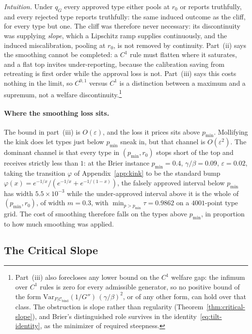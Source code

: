 \documentclass[acmsmall,nonacm,screen]{acmart}
\theoremstyle{acmplain}%
\theoremstyle{acmdefinition}%
\newcommand{\Cbind}{\mathcal{C}_{\mathrm{bind}}}
\numberwithin{equation}{section}
\begin{document}
\emph{Intuition.} Under $q_G$ every approved type either pools at $r_0$ or reports truthfully, and every rejected type reports truthfully: the same induced outcome as the cliff, for every type but one. The cliff was therefore never necessary: its discontinuity was supplying \emph{slope}, which a Lipschitz ramp supplies continuously, and the induced miscalibration, pooling at $r_0$, is not removed by continuity. Part~(ii) says the smoothing cannot be completed: a $C^1$ rule must flatten where it saturates, and a flat top invites under-reporting, because the calibration saving from retreating is first order while the approval loss is not. Part~(iii) says this costs nothing in the limit, so $C^{0,1}$ versus $C^1$ is a distinction between a maximum and a supremum, not a welfare discontinuity.\footnote{Part~(iii) also forecloses any lower bound on the $C^1$ welfare gap: the infimum over $C^1$ rules is zero for every admissible generator, so no positive bound of the form $\mathrm{Var}_{F|\Cbind}(1/G'')\,(\gamma/\beta)^2$, or of any other form, can hold over that class. The obstruction is slope rather than regularity (Theorem~\ref{thm:critical-slope}), and Brier's distinguished role survives in the identity~\eqref{eq:tilt-identity}, as the minimizer of required steepness.}

\paragraph{Where the smoothing loss sits.}
The bound in part~(iii) is $O(\varepsilon)$, and the loss it prices sits above $p_{\min}$. Mollifying the kink does let types just below $p_{\min}$ sneak in, but that channel is $O(\varepsilon^2)$. The dominant channel is that every type in $(p_{\min},r_0)$ stops short of the top and receives strictly less than $1$: at the Brier instance $p_{\min} = 0.4$, $\gamma/\beta = 0.09$, $\varepsilon = 0.02$, taking the transition $\varphi$ of Appendix~\ref{app:kink} to be the standard bump $\varphi(x) = e^{-1/x}/(e^{-1/x}+e^{-1/(1-x)})$, the falsely approved interval below $p_{\min}$ has width $5.5 \times 10^{-3}$ while the under-approved interval above it is the whole of $(p_{\min},r_0)$, of width $m = 0.3$, with $\min_{p > p_{\min}} \tau = 0.9862$ on a $4001$-point type grid. The cost of smoothing therefore falls on the types above $p_{\min}$, in proportion to how much smoothing was applied.

\subsection{The Critical Slope}
\end{document}
